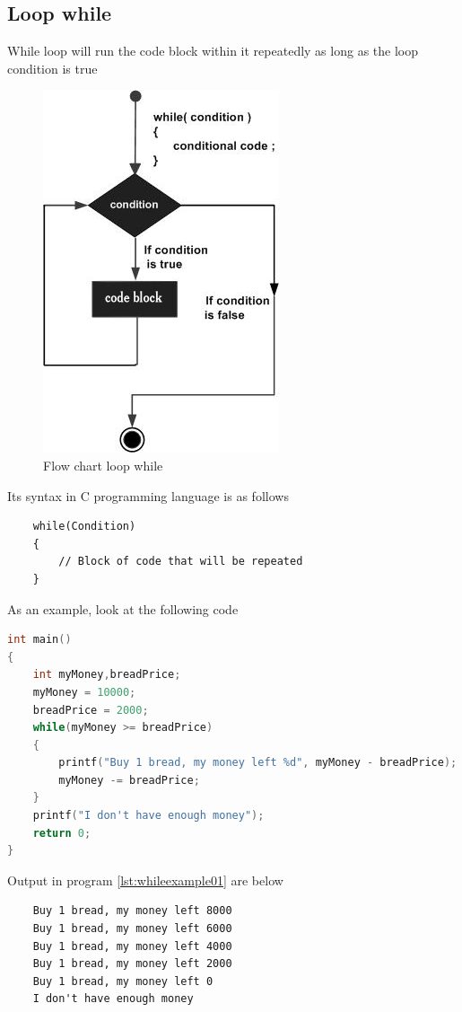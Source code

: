 \subsection{Loop while}
While loop will run the code block within it repeatedly as long as the loop condition is true


\begin{figure}[H]
	\centering
	\includegraphics[width=0.4\linewidth]{P2/img/whileloop.png}
	\caption{Flow chart loop while}
	\label{fig:whileloop}
\end{figure}

Its syntax in C programming language is as follows
\begin{verbatim}
    while(Condition)
    {
        // Block of code that will be repeated
    }
\end{verbatim}

As an example, look at the following code
\begin{lstlisting}[language=c,caption = While implementation example,label=lst:whileexample01]
int main()
{
	int myMoney,breadPrice;
	myMoney = 10000;
	breadPrice = 2000;
	while(myMoney >= breadPrice)
	{
	    printf("Buy 1 bread, my money left %d", myMoney - breadPrice);
	    myMoney -= breadPrice;
	}
	printf("I don't have enough money");
	return 0;
}
\end{lstlisting}
Output in program \ref{lst:whileexample01} are below
\begin{verbatim}
    Buy 1 bread, my money left 8000
    Buy 1 bread, my money left 6000
    Buy 1 bread, my money left 4000
    Buy 1 bread, my money left 2000
    Buy 1 bread, my money left 0
    I don't have enough money
\end{verbatim}

